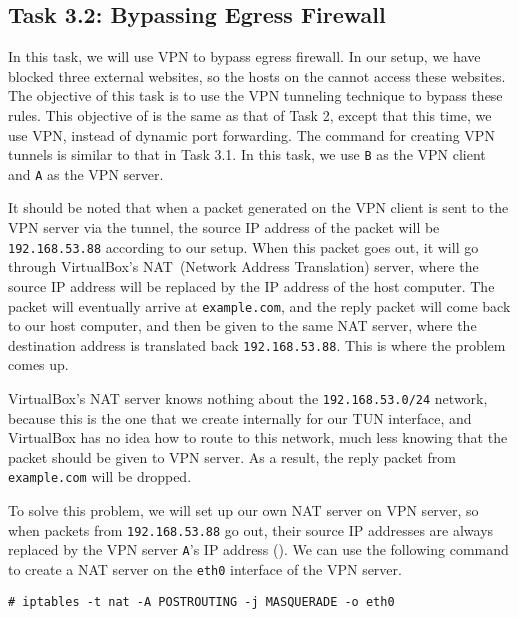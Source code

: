 \subsection{Task 3.2: Bypassing Egress Firewall} 

In this task, we will use VPN to bypass egress firewall. 
In our setup, we have blocked three external websites, so the 
hosts on the \internalnet cannot access these websites. 
The objective of this task is to use the VPN tunneling 
technique to bypass these rules. This objective of is the same as that of 
Task 2, except that this time, we use VPN, 
instead of dynamic port forwarding. 
The command for creating VPN tunnels is similar to that in
Task 3.1. In this task, we use \texttt{B} as the VPN client 
and \texttt{A} as the VPN server. 


It should be noted that when a packet generated on the VPN client is
sent to the VPN server via the tunnel, the source IP address of the 
packet will be \texttt{192.168.53.88} according to our setup. 
When this packet goes out, it will go through VirtualBox's NAT~(Network
Address Translation) server, where the source IP address will be replaced by the IP address of
the host computer. The
packet will eventually arrive at \texttt{example.com}, and the reply packet will come
back to our host computer, and then be given to the same NAT server, where the destination
address is translated back \texttt{192.168.53.88}. This is where the problem comes up.

VirtualBox's NAT server knows nothing about the \texttt{192.168.53.0/24} network, because this is
the one that we create internally for our TUN interface, and VirtualBox
has no idea how to route to this network,
much less knowing that the packet should be given to VPN server.
As a result, the reply packet from \texttt{example.com} will be dropped.

To solve this problem, we will set up our own NAT server on VPN server, so when packets
from \texttt{192.168.53.88} go out, their source IP addresses are always replaced by
the VPN server \texttt{A}'s IP address (\hostA). We can use the following command to
create a NAT server on the \texttt{eth0} interface of the VPN server.

\begin{lstlisting}
# iptables -t nat -A POSTROUTING -j MASQUERADE -o eth0
\end{lstlisting}


